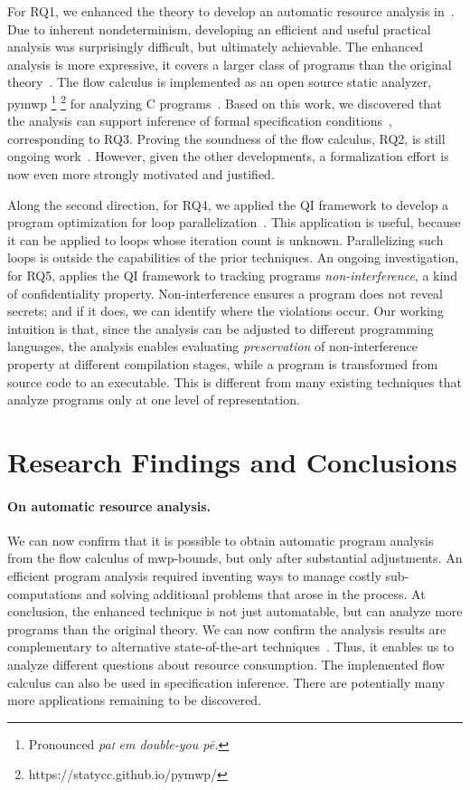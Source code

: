 For RQ1, we enhanced the theory to develop an automatic resource analysis in~\cite{aubert20222,aubert2023b,rusch2025}.
Due to inherent nondeterminism, developing an efficient and useful practical analysis was surprisingly difficult, but ultimately achievable.
The enhanced analysis is more expressive,
\ie it covers a larger class of programs than the original theory~\cite{rusch2025}.
The flow calculus is implemented as an open source static analyzer, pymwp%
\footnote{Pronounced \emph{pa\textsc{i} em double-you p\={e}.}}%
\footnote{https://statycc.github.io/pymwp/}{ }for analyzing C programs~\cite{aubert2023b}.
Based on this work, we discovered that the analysis can support
inference of formal specification conditions~\cite{rusch2025}, corresponding to RQ3.
Proving the soundness of the flow calculus, RQ2, is still ongoing work~\cite{aubert20232}.
However, given the other developments, a formalization effort is now even more strongly motivated and justified.

Along the second direction, for RQ4, we applied the QI framework to develop a program optimization for loop parallelization~\cite{aubert20232}.
This application is useful, because it can be applied to loops whose iteration count is unknown.
Parallelizing such loops is outside the capabilities of the prior techniques.
An ongoing investigation, for RQ5, applies the QI framework to tracking programs \emph{non\hyp{}interference}, a kind of confidentiality property.
Non-interference ensures a program does not reveal secrets;
and if it does, we can identify where the violations occur.
Our working intuition is that, since the analysis can be adjusted to different programming languages, the analysis enables evaluating \emph{preservation} of non-interference property at different compilation stages, while a program is transformed from source code to an executable.
This is different from many existing techniques that analyze programs only at one level of representation.

\section{Research Findings and Conclusions}
\label{aicc-discussion}

\paragraph*{On automatic resource analysis.}
We can now confirm that it is possible to obtain automatic program analysis from the flow calculus of mwp-bounds, but only after substantial adjustments.
An efficient program analysis required inventing ways to manage costly sub-computations and solving additional problems that arose in the process.
At conclusion, the enhanced technique is not just automatable, but can analyze more programs than the original theory.
We can now confirm the analysis results are complementary to alternative state-of-the-art techniques~\cite[p. 5]{aubert2023b}.
Thus, it enables us to analyze different questions about resource consumption.
The implemented flow calculus can also be used in specification inference.
There are potentially many more applications remaining to be discovered.

